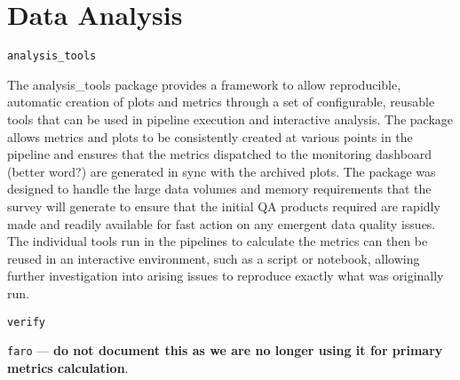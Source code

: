 \section{Data Analysis}
\label{sec:analysis}

\texttt{analysis\_tools}

The analysis_tools package provides a framework to allow reproducible, automatic creation of plots and metrics through a set of configurable, reusable tools that can be used in pipeline execution and interactive analysis.
The package allows metrics and plots to be consistently created at various points in the pipeline and ensures that the metrics dispatched to the monitoring dashboard (better word?) are generated in sync with the archived plots.
The package was designed to handle the large data volumes and memory requirements that the survey will generate to ensure that the initial QA products required are rapidly made and readily available for fast action on any emergent data quality issues.
The individual tools run in the pipelines to calculate the metrics can then be reused in an interactive environment, such as a script or notebook, allowing further investigation into arising issues to reproduce exactly what was originally run.

\texttt{verify}

\texttt{faro} --- \textbf{do not document this as we are no longer using it for primary metrics calculation}.
